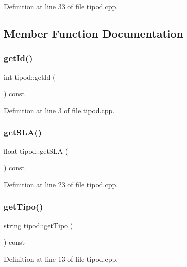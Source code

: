 Definition at line 33 of file tipod.\+cpp.



\subsection{Member Function Documentation}
\hypertarget{classtipod_a8f9426cbcef23976293ae0961b382907}{}\label{classtipod_a8f9426cbcef23976293ae0961b382907} 
\subsubsection{\texorpdfstring{get\+Id()}{getId()}}
{\footnotesize\ttfamily int tipod\+::get\+Id (\begin{DoxyParamCaption}{ }\end{DoxyParamCaption}) const}



Definition at line 3 of file tipod.\+cpp.

\hypertarget{classtipod_a19cb0132a802684607abe02c0c2b63f2}{}\label{classtipod_a19cb0132a802684607abe02c0c2b63f2} 
\subsubsection{\texorpdfstring{get\+S\+L\+A()}{getSLA()}}
{\footnotesize\ttfamily float tipod\+::get\+S\+LA (\begin{DoxyParamCaption}{ }\end{DoxyParamCaption}) const}



Definition at line 23 of file tipod.\+cpp.

\hypertarget{classtipod_a2cefc9bc0bfe44e8adfba1e839b2de2e}{}\label{classtipod_a2cefc9bc0bfe44e8adfba1e839b2de2e} 
\subsubsection{\texorpdfstring{get\+Tipo()}{getTipo()}}
{\footnotesize\ttfamily string tipod\+::get\+Tipo (\begin{DoxyParamCaption}{ }\end{DoxyParamCaption}) const}



Definition at line 13 of file tipod.\+cpp.

